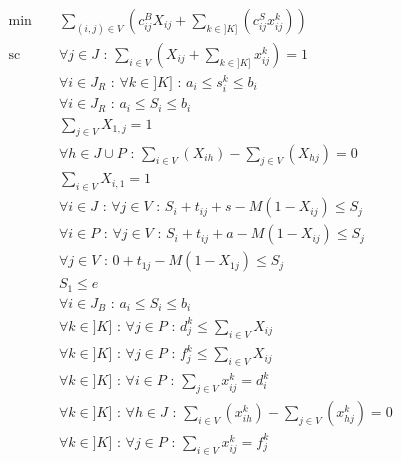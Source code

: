 \documentclass[12pt,a4paper,fleqn]{article}
\begin{document}
\begin{align}
& \text{min } && \sum \limits_{(i,j) \in V} (c^B_{ij}X_{ij} + \sum \limits_{k \in ]K]}( c^S_{ij}x^k_{ij})) \\[10pt]
& \text{sc }  && \forall j \in J \text{ : } \sum \limits_{i \in V}( X_{ij} + \sum \limits_{k \in ]K]} x^k_{ij} ) = 1 \label{tousservis} \\
& && \forall i \in J_R \text{ : } \forall k \in ]K] \text{ : } a_i \leqslant s_i^k \leqslant b_i \label{fenetrerestant1} \\
& && \forall i \in J_R \text{ : } a_i \leqslant S_i \leqslant b_i \label{fenetrerestant2} \\[30pt]
& && \sum \limits_{j \in V} X_{1,j} = 1 \label{partirdudepot} \\
& && \forall h \in J \cup P \text{ : } \sum \limits_{i \in V} (X_{ih}) - \sum \limits_{j \in V} (X_{hj}) = 0 \label{flotgros} \\
& && \sum \limits_{i \in V} X_{i,1} = 1 \label{reveniraudepot} \\
& && \forall i \in J \text{ : } \forall j \in V \text{ : } S_i + t_{ij} + s - M(1-X_{ij}) \leqslant S_j \label{sequentialitegros1} \\
& && \forall i \in P \text{ : } \forall j \in V \text{ : } S_i + t_{ij} + a - M(1-X_{ij}) \leqslant S_j \label{sequentialitegros2} \\
& && \forall j \in V \text{ : } 0 + t_{1j} - M(1-X_{1j}) \leqslant S_j \label{sequentialitegros3} \\
& && S_{1} \leqslant e \label{findejournee} \\
& && \forall i \in J_B \text{ : } a_i \leqslant S_i \leqslant b_i \label{fenetregros} \\[30pt]
& && \forall k \in ]K] \text{ : } \forall j \in P \text{ : } d^k_j \leqslant \sum \limits_{i \in V} X_{ij} \label{separationvalide} \\
& && \forall k \in ]K] \text{ : } \forall j \in P \text{ : } f^k_j \leqslant \sum \limits_{i \in V} X_{ij} \label{mergevalide} \\
& && \forall k \in ]K] \text{ : } \forall i \in P \text{ : } \sum \limits_{j \in V} x^k_{ij} = d^k_i \label{partirdugros} \\
& && \forall k \in ]K] \text{ : } \forall h \in J \text{ : } \sum \limits_{i \in V} (x_{ih}^k) - \sum \limits_{j \in V} (x_{hj}^k) = 0 \label{flotpetit} \\
& && \forall k \in ]K] \text{ : } \forall j \in P \text{ : } \sum \limits_{i \in V} x^k_{ij} = f^k_j \label{reveniraugros} \\

\end{align}
\end{document}
